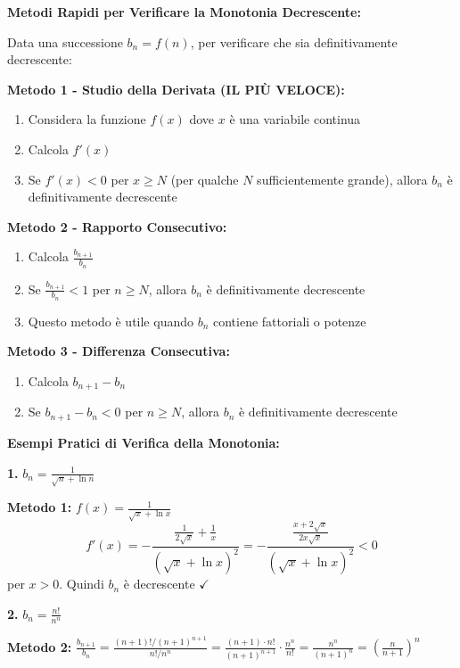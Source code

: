 \begin{enumerate}
\begin{itemize}
    \begin{strategia}
    \textbf{Metodi Rapidi per Verificare la Monotonia Decrescente:}
    
    Data una successione $b_n = f(n)$, per verificare che sia definitivamente decrescente:
    
    \textbf{Metodo 1 - Studio della Derivata (IL PIÙ VELOCE):}
    \begin{enumerate}
        \item Considera la funzione $f(x)$ dove $x$ è una variabile continua
        \item Calcola $f'(x)$
        \item Se $f'(x) < 0$ per $x \geq N$ (per qualche $N$ sufficientemente grande), allora $b_n$ è definitivamente decrescente
    \end{enumerate}
    
    \textbf{Metodo 2 - Rapporto Consecutivo:}
    \begin{enumerate}
        \item Calcola $\frac{b_{n+1}}{b_n}$
        \item Se $\frac{b_{n+1}}{b_n} < 1$ per $n \geq N$, allora $b_n$ è definitivamente decrescente
        \item Questo metodo è utile quando $b_n$ contiene fattoriali o potenze
    \end{enumerate}
    
    \textbf{Metodo 3 - Differenza Consecutiva:}
    \begin{enumerate}
        \item Calcola $b_{n+1} - b_n$
        \item Se $b_{n+1} - b_n < 0$ per $n \geq N$, allora $b_n$ è definitivamente decrescente
    \end{enumerate}
    \end{strategia}

    \begin{esempio}
    \textbf{Esempi Pratici di Verifica della Monotonia:}
    
    \textbf{1.} $b_n = \frac{1}{\sqrt{n} + \ln n}$
    
    \textbf{Metodo 1:} $f(x) = \frac{1}{\sqrt{x} + \ln x}$
    \[ f'(x) = -\frac{\frac{1}{2\sqrt{x}} + \frac{1}{x}}{(\sqrt{x} + \ln x)^2} = -\frac{\frac{x + 2\sqrt{x}}{2x\sqrt{x}}}{(\sqrt{x} + \ln x)^2} < 0 \]
    per $x > 0$. Quindi $b_n$ è decrescente $\checkmark$
    
    \textbf{2.} $b_n = \frac{n!}{n^n}$
    
    \textbf{Metodo 2:} $\frac{b_{n+1}}{b_n} = \frac{(n+1)!/(n+1)^{n+1}}{n!/n^n} = \frac{(n+1) \cdot n!}{(n+1)^{n+1}} \cdot \frac{n^n}{n!} = \frac{n^n}{(n+1)^n} = \left(\frac{n}{n+1}\right)^n$
    

\end{esempio}
\end{itemize}
\end{enumerate}
